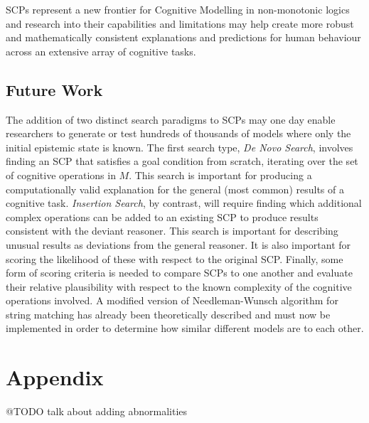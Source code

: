 \documentclass[
11pt, %
english, %
singlespacing, %
headsepline, %
]{MastersDoctoralThesis} %
\begin{document}
SCPs represent a new frontier for Cognitive Modelling in non-monotonic logics and research into their capabilities and limitations may help create more robust and mathematically consistent explanations and predictions for human behaviour across an extensive array of cognitive tasks.
\section{Future Work}
The addition of two distinct search paradigms to SCPs may one day enable researchers to generate or test hundreds of thousands of models where only the initial epistemic state is known. The first search type, \textit{De Novo Search}, involves finding an SCP that satisfies a goal condition from scratch, iterating over the set of cognitive operations in $M$. This search is important for producing a computationally valid explanation for the general (most common) results of a cognitive task. \textit{Insertion Search}, by contrast, will require finding which additional complex operations can be added to an existing SCP to produce results consistent with the deviant reasoner. This search is important for describing unusual results as deviations from the general reasoner. It is also important for scoring the likelihood of these with respect to the original SCP. Finally, some form of scoring criteria is needed to compare SCPs to one another and evaluate their relative plausibility with respect to the known complexity of the cognitive operations involved. A modified version of Needleman-Wunsch algorithm for string matching has already been theoretically described and must now be implemented in order to determine how similar different models are to each other.
\chapter*{Appendix}
@TODO talk about adding abnormalities


\appendix %



%
%


\printbibliography[heading=bibintoc]

\end{document}
